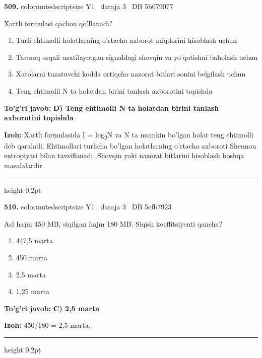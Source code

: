 \documentclass[10pt,a4paper,oneside]{article}
\begin{document}
\noindent\textbf{\color{ink}509.}  {color{muted}scriptsize Y1 \textbullet\ daraja 3 \textbullet\ DB 5b079077}
\par
Xartli formulasi qachon qo'llanadi?
\begin{enumerate}[label=\Alph*),leftmargin=9mm]
\item Turli ehtimolli holatlarning o'rtacha axborot miqdorini hisoblash uchun
\item Tarmoq orqali uzatilayotgan signaldagi shovqin va yo'qotishni baholash uchun
\item Xatolarni tuzatuvchi kodda ortiqcha nazorat bitlari sonini belgilash uchun
\item Teng ehtimolli N ta holatdan birini tanlash axborotini topishda
\end{enumerate}
\begin{tcolorbox}[enhanced,breakable,colback=teal!4,colframe=teal!50!black,boxrule=0.5pt,arc=1.1mm,left=3mm,right=3mm,top=1.7mm,bottom=1.7mm,before skip=2mm,after skip=2mm]
\textbf{\color{teal}To'g'ri javob:} \textbf{D) Teng ehtimolli N ta holatdan birini tanlash axborotini topishda}
\par\smallskip
\textbf{Izoh:} Xartli formulasida I = log\textsubscript{2}N va N ta mumkin bo'lgan holat teng ehtimolli deb qaraladi. Ehtimollari turlicha bo'lgan holatlarning o'rtacha axboroti Shennon entropiyasi bilan tavsiflanadi. Shovqin yoki nazorat bitlarini hisoblash boshqa masalalardir.
\end{tcolorbox}
\vspace{2mm}\hrule height 0.2pt \vspace{3mm}

\noindent\textbf{\color{ink}510.}  {color{muted}scriptsize Y1 \textbullet\ daraja 3 \textbullet\ DB 5cfb7923}
\par
Asl hajm 450 MB, siqilgan hajm 180 MB. Siqish koeffitsiyenti qancha?
\begin{enumerate}[label=\Alph*),leftmargin=9mm]
\item 447,5 marta
\item 450 marta
\item 2,5 marta
\item 1,25 marta
\end{enumerate}
\begin{tcolorbox}[enhanced,breakable,colback=teal!4,colframe=teal!50!black,boxrule=0.5pt,arc=1.1mm,left=3mm,right=3mm,top=1.7mm,bottom=1.7mm,before skip=2mm,after skip=2mm]
\textbf{\color{teal}To'g'ri javob:} \textbf{C) 2,5 marta}
\par\smallskip
\textbf{Izoh:} 450/180 = 2,5 marta.
\end{tcolorbox}
\vspace{2mm}\hrule height 0.2pt \vspace{3mm}
\end{document}
